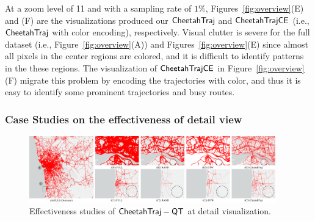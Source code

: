 
At a zoom level of 11 and with a sampling rate of $1\%$, Figures~\ref{fig:overview}(E) and (F) are the visualizations produced our $\mathsf{CheetahTraj}$ and $\mathsf{CheetahTraj}\mathsf{CE}$ (i.e., $\mathsf{CheetahTraj}$ with color encoding), respectively.
Visual clutter is severe for the full dataset (i.e., Figure~\ref{fig:overview}(A)) and Figures~\ref{fig:overview}(E) since almost all pixels in the center regions are colored, and it is difficult to identify patterns in the these regions. The visualization of $\mathsf{CheetahTraj}\mathsf{CE}$ in Figure~\ref{fig:overview}(F) migrate this problem by encoding the trajectories with color, and thus it is easy to identify some prominent trajectories and busy routes. 


\subsubsection{Case Studies on the effectiveness of detail view}\label{sec:detail}


\begin{figure}[t]
	\centering
	\includegraphics[width=0.95\textwidth]{pictures/case_study_icde/case_study_detail.pdf}
	\vspace{-3mm}
	\caption{Effectiveness studies of $\mathsf{CheetahTraj}-\mathsf{QT}$ at detail visualization.}
	\label{fig:detailview}
	\vspace{-2mm}
\end{figure}

